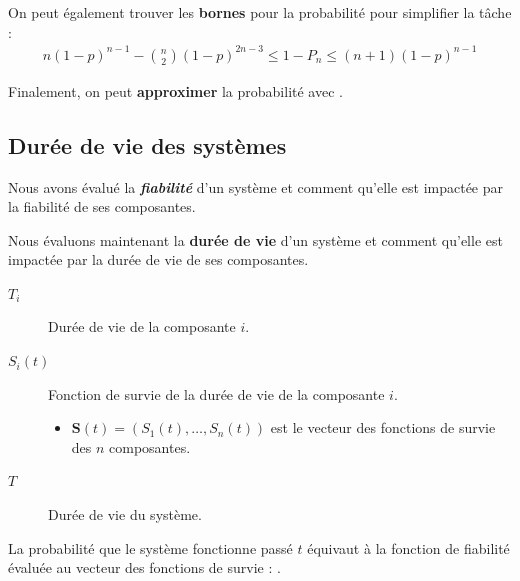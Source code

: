 \documentclass[french]{article}
\begin{document}
\begin{multicols*}{2}
\begin{definitionNOHFILLprop}
\tcbline

On peut également trouver les \textbf{bornes} pour la probabilité pour simplifier la tâche : 
\begin{align*}
	n(1 - p)^{n - 1} - \binom{n}{2} (1 - p)^{2n - 3}	
	\leq	1 - P_{n}		\leq	
	(n + 1) (1 - p)^{n - 1}
\end{align*}

\tcbline

Finalement, on peut \textbf{approximer} la probabilité avec .
\end{definitionNOHFILLprop}


\columnbreak
\subsection{Durée de vie des systèmes}
\begin{rappel_enhanced}[Contexte]
Nous avons évalué la \textbf{\textit{fiabilité}} d'un système et comment qu'elle est impactée par la fiabilité de ses composantes.

\bigskip

Nous évaluons maintenant la \textbf{durée de vie} d'un système et comment qu'elle est impactée par la durée de vie de ses composantes.
\end{rappel_enhanced}

\begin{distributions}[Notation]
\begin{description}
	\item[$T_{i}$]	Durée de vie de la composante $i$.
	\item[$S_{i}(t)$]	Fonction de survie de la durée de vie de la composante $i$.
		\begin{itemize}
		\item	$\bm{S}(t)	=	\left(S_{1}(t), \dots, S_{n}(t)\right)$ est le vecteur des fonctions de survie des $n$ composantes.
		\end{itemize}
	\item[$T$]	Durée de vie du système.
\end{description}
\end{distributions}

\begin{definitionNOHFILLprop}
La probabilité que le système fonctionne passé $t$ équivaut à la fonction de fiabilité évaluée au vecteur des fonctions de survie : .

\bigskip


\end{definitionNOHFILLprop}
\end{multicols*}
\end{document}
